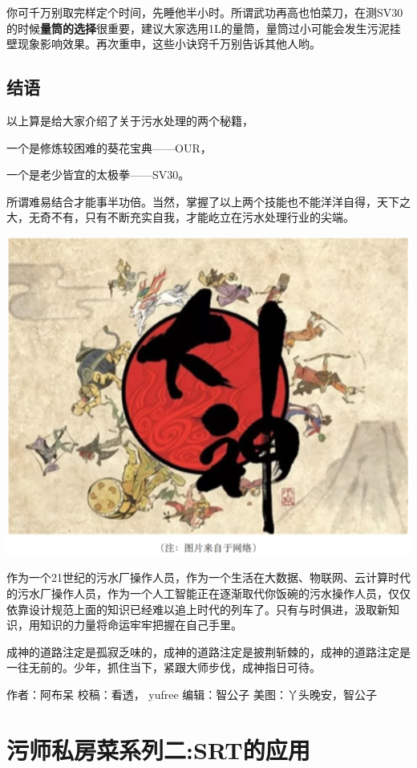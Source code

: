 \documentclass[]{book}
\begin{document}
你可千万别取完样定个时间，先睡他半小时。所谓武功再高也怕菜刀，在测SV30的时候\textbf{量筒的选择}很重要，建议大家选用1L的量筒，量筒过小可能会发生污泥挂壁现象影响效果。再次重申，这些小诀窍千万别告诉其他人哟。

\subsection{结语}\label{-3}

以上算是给大家介绍了关于污水处理的两个秘籍，

一个是修炼较困难的葵花宝典------OUR，

一个是老少皆宜的太极拳------SV30。

所谓难易结合才能事半功倍。当然，掌握了以上两个技能也不能洋洋自得，天下之大，无奇不有，只有不断充实自我，才能屹立在污水处理行业的尖端。

\includegraphics[width=6.67in]{images/os4}

作为一个21世纪的污水厂操作人员，作为一个生活在大数据、物联网、云计算时代的污水厂操作人员，作为一个人工智能正在逐渐取代你饭碗的污水操作人员，仅仅依靠设计规范上面的知识已经难以追上时代的列车了。只有与时俱进，汲取新知识，用知识的力量将命运牢牢把握在自己手里。

成神的道路注定是孤寂乏味的，成神的道路注定是披荆斩棘的，成神的道路注定是一往无前的。少年，抓住当下，紧跟大师步伐，成神指日可待。

作者：阿布呆 校稿：看透， yufree 编辑：智公子 美图：丫头晚安，智公子

\section{污师私房菜系列二:SRT的应用}\label{srt}
\end{document}
